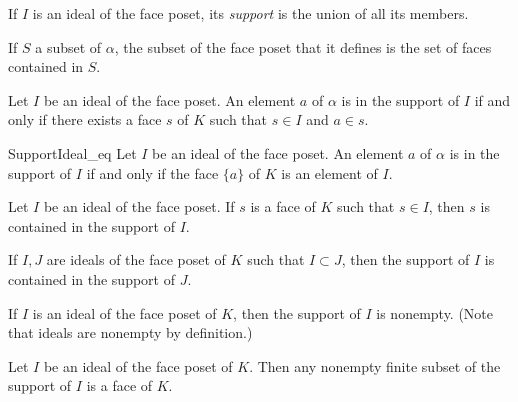 \begin{subdefi}[SupportIdeal]
If $I$ is an ideal of the face poset, its \emph{support} is the union of all its members.

\end{subdefi}

\begin{subdefi}[IdealFromSet]
If $S$ a subset of $\alpha$, the subset of the face poset that it defines is the set of faces contained in $S$.

\end{subdefi}

\begin{sublemma}
Let $I$ be an ideal of the face poset. An element $a$ of $\alpha$ is in the support of $I$ if and only if there exists
a face $s$ of $K$ such that $s\in I$ and $a\in s$.

\end{sublemma}

\begin{sublemma}SupportIdeal\_eq
Let $I$ be an ideal of the face poset. An element $a$ of $\alpha$ is in the support of $I$ if and only if the face
$\{a\}$ of $K$ is an element of $I$.

\end{sublemma}

\begin{sublemma}
Let $I$ be an ideal of the face poset. If $s$ is a face of $K$ such that $s\in I$, then $s$ is contained in the support of $I$.

\end{sublemma}

\begin{sublemma}
If $I,J$ are ideals of the face poset of $K$ such that $I\subset J$, then the support of $I$ is contained in the support of $J$.

\end{sublemma}

\begin{sublemma}
If $I$ is an ideal of the face poset of $K$, then the support of $I$ is nonempty. (Note that ideals are nonempty by definition.)

\end{sublemma}

\begin{sublemma}
Let $I$ be an ideal of the face poset of $K$. Then any nonempty finite subset of the support of $I$ is a face of $K$.

\end{sublemma}

